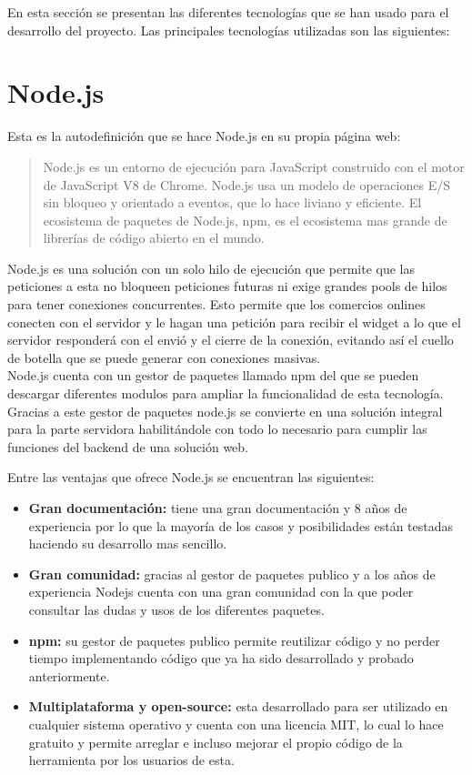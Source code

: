 En esta sección se presentan las diferentes tecnologías que se han usado para el desarrollo del proyecto. Las principales tecnologías utilizadas son las siguientes:

\section{Node.js}
Esta es la autodefinición que se hace Node.js\cite{node} en su propia página web:

\begin{quote}
	Node.js es un entorno de ejecución para JavaScript construido con el motor de JavaScript V8 de Chrome. Node.js usa un modelo de operaciones E/S sin bloqueo y orientado a eventos, que lo hace liviano y eficiente. El ecosistema de paquetes de Node.js, npm, es el ecosistema mas grande de librerías de código abierto en el mundo.\\
\end{quote}


Node.js es una solución con un solo hilo de ejecución que permite que las peticiones a esta no bloqueen peticiones futuras ni exige grandes pools de hilos para tener conexiones concurrentes. Esto permite que los comercios onlines conecten con el servidor y le hagan una petición para recibir el widget a lo que el servidor responderá con el envió y el cierre de la conexión, evitando así el cuello de botella que se puede generar con conexiones masivas.\\

Node.js cuenta con un gestor de paquetes llamado npm\cite{npm} del que se pueden descargar diferentes modulos para ampliar la funcionalidad de esta tecnología. Gracias a este gestor de paquetes node.js se convierte en una solución integral para la parte servidora habilitándole con todo lo necesario para cumplir las funciones del backend de una solución web.

Entre las ventajas que ofrece Node.js se encuentran las siguientes:

\begin{itemize}
	\item \textbf{Gran documentación:} tiene una gran documentación y 8 años de experiencia por lo que la mayoría de los casos y posibilidades están testadas haciendo su desarrollo mas sencillo.
	\item \textbf{Gran comunidad:} gracias al gestor de paquetes publico y a los años de experiencia Nodejs cuenta con una gran comunidad con la que poder consultar las dudas y usos de los diferentes paquetes.
	\item \textbf{npm:} su gestor de paquetes publico  permite reutilizar código y no perder tiempo implementando código que ya ha sido desarrollado y probado anteriormente.
	\item \textbf{Multiplataforma y open-source:} esta desarrollado para ser utilizado en cualquier sistema operativo y cuenta con una licencia MIT, lo cual lo hace gratuito y permite arreglar e incluso mejorar el propio código de la herramienta por los usuarios de esta.
\end{itemize}


